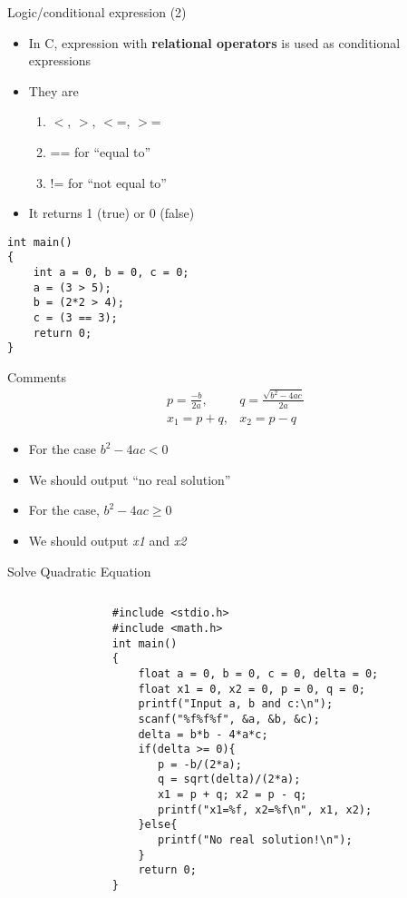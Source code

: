 \begin{frame}[fragile]{Logic/conditional expression (2)}
	\begin{itemize}
		\item {In C, expression with \textbf{relational operators} is used as conditional expressions}
		\item {They are}
		\begin{enumerate}
			\item {$<$, $>$, $<$=, $>$=}
			\item {== for ``equal to''}
			\item {!= for ``not equal to''}
		\end{enumerate}
		\item {It returns 1 (true) or 0 (false)}
	\end{itemize}
\begin{lstlisting}
int main()
{
    int a = 0, b = 0, c = 0;
    a = (3 > 5);
    b = (2*2 > 4);
    c = (3 == 3);
    return 0;
}
\end{lstlisting} 
\end{frame}

\begin{frame}[fragile]{Comments}
\vspace{-0.3in}
\begin{eqnarray}
p=\frac{-b}{2a}, & q=\frac{\sqrt{b^2-4ac}}{2a} \nonumber \\
x_1=p+q, & x_2=p-q \nonumber
\end{eqnarray}
\begin{itemize}
	\item {For the case ${b^2-4ac} < 0$}
	\item {We should output ``no real solution''}
	\item {For the case, ${b^2-4ac} \geq 0$}
	\item {We should output \textit{x1} and \textit{x2}}
\end{itemize}

\end{frame}

\begin{frame}[fragile]{Solve Quadratic Equation}
\vspace{-0.3in}
	\begin{columns}
		\begin{column}{0.1\linewidth}
		\end{column}
		\begin{column}{0.9\linewidth}
	\begin{lstlisting}[]
#include <stdio.h>
#include <math.h>
int main()
{
    float a = 0, b = 0, c = 0, delta = 0;
    float x1 = 0, x2 = 0, p = 0, q = 0;
    printf("Input a, b and c:\n");
    scanf("%f%f%f", &a, &b, &c);
    delta = b*b - 4*a*c;
    if(delta >= 0){
       p = -b/(2*a);
       q = sqrt(delta)/(2*a);
       x1 = p + q; x2 = p - q;
       printf("x1=%f, x2=%f\n", x1, x2);
    }else{
       printf("No real solution!\n");
    }
    return 0;
}
	\end{lstlisting}
	\end{column}
\end{columns}
\end{frame}

